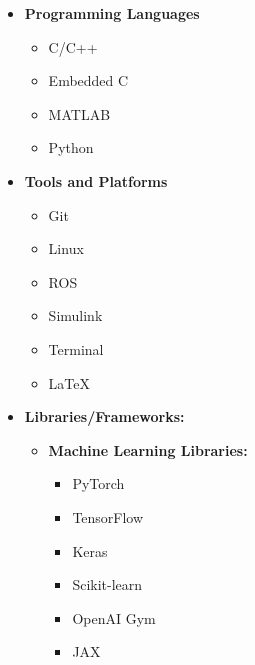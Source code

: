 \documentclass[12pt]{article}
\begin{document}
\begin{itemize}
	\item \textbf{Programming Languages}\itemsep -4pt
	\begin{multicols}{4}
		\begin{itemize}
			\item C/C++
			\item Embedded C
			\item MATLAB
			\item Python \faPython
		\end{itemize}
	\end{multicols}
	\item \textbf{Tools and Platforms}	
	\begin{multicols}{3}
		\begin{itemize}
			\item Git \faGitSquare
			\item Linux \faLinux
			\item ROS
			\item Simulink
			\item Terminal \faTerminal
			\item \LaTeX
		\end{itemize}
	\end{multicols}
	\item \textbf{Libraries/Frameworks:} 
	\begin{itemize}
		\item \textbf{Machine Learning Libraries:}
		\begin{multicols}{2}
			\begin{itemize}
				\item PyTorch
				\item TensorFlow
				\item Keras
				\item Scikit-learn
				\item OpenAI Gym
				\item JAX
			\end{itemize}
		\end{multicols}
	

\end{itemize}
\end{itemize}
\end{document}
